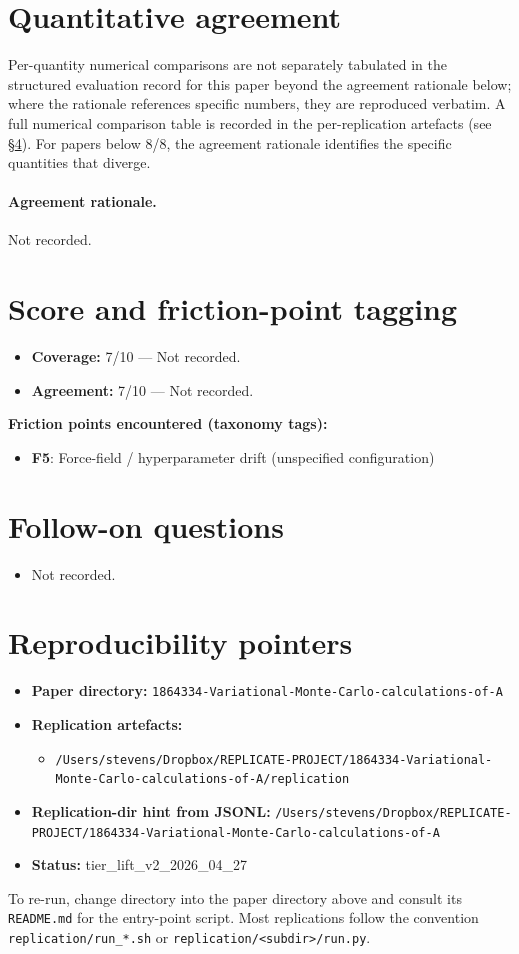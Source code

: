 \documentclass[11pt]{article}
\begin{document}
\section{Quantitative agreement}
Per-quantity numerical comparisons are not separately tabulated in the structured evaluation record for this paper beyond the agreement rationale below; where the rationale references specific numbers, they are reproduced verbatim. A full numerical comparison table is recorded in the per-replication artefacts (see \S\ref{sec:repro}). For papers below 8/8, the agreement rationale identifies the specific quantities that diverge.

\paragraph{Agreement rationale.} Not recorded.

\section{Score and friction-point tagging}\label{sec:friction}
\begin{itemize}
\item \textbf{Coverage:} 7/10 --- Not recorded.
\item \textbf{Agreement:} 7/10 --- Not recorded.
\end{itemize}

\noindent\textbf{Friction points encountered (taxonomy tags):}
\begin{itemize}
\item \textbf{F5}: Force-field / hyperparameter drift (unspecified configuration)
\end{itemize}

\section{Follow-on questions}
\begin{itemize}
\item Not recorded.
\end{itemize}

\section{Reproducibility pointers}\label{sec:repro}
\begin{itemize}
\item \textbf{Paper directory:} \texttt{1864334-Variational-Monte-Carlo-calculations-of-A}
\item \textbf{Replication artefacts:}
\begin{itemize}
\item \texttt{/Users/stevens/Dropbox/REPLICATE-PROJECT/1864334-Variational-Monte-Carlo-calculations-of-A/replication}
\end{itemize}
\item \textbf{Replication-dir hint from JSONL:} \texttt{/Users/stevens/Dropbox/REPLICATE-PROJECT/1864334-Variational-Monte-Carlo-calculations-of-A}
\item \textbf{Status:} tier\_lift\_v2\_2026\_04\_27
\end{itemize}

To re-run, change directory into the paper directory above and consult its \texttt{README.md} for the entry-point script. Most replications follow the convention \texttt{replication/run\_*.sh} or \texttt{replication/<subdir>/run.py}.
\end{document}
